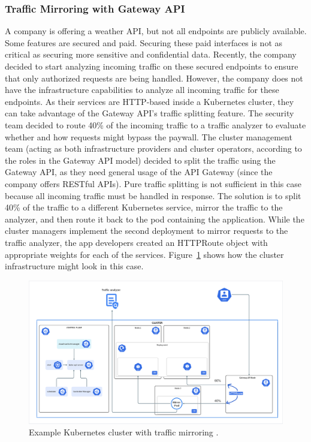 
\subsubsection{Traffic Mirroring with Gateway API}
\label{subsubsection:mirroring}

A company is offering a weather API, but not all endpoints are publicly available. Some features are secured and paid. Securing these paid interfaces is not as critical as securing more sensitive and confidential data. Recently, the company decided to start analyzing incoming traffic on these secured endpoints to ensure that only authorized requests are being handled. However, the company does not have the infrastructure capabilities to analyze all incoming traffic for these endpoints. As their services are HTTP-based inside a Kubernetes cluster, they can take advantage of the Gateway API’s traffic splitting feature. The security team decided to route 40\% of the incoming traffic to a traffic analyzer to evaluate whether and how requests might bypass the paywall. The cluster management team (acting as both infrastructure providers and cluster operators, according to the roles in the Gateway API model) decided to split the traffic using the Gateway API, as they need general usage of the API Gateway (since the company offers RESTful APIs). Pure traffic splitting is not sufficient in this case because all incoming traffic must be handled in response. The solution is to split 40\% of the traffic to a different Kubernetes service, mirror the traffic to the analyzer, and then route it back to the pod containing the application. While the cluster managers implement the second deployment to mirror requests to the traffic analyzer, the app developers created an HTTPRoute object with appropriate weights for each of the services. Figure~\ref{fig:mirroringImg} shows how the cluster infrastructure might look in this case.


\begin{figure}[H]
    \centering
    \includegraphics[width=1\columnwidth]{images/ingress.png}
    \caption{Example Kubernetes cluster with traffic mirroring \cite{KubernetesArch}\cite{K8sIcons}\cite{LucidApp}.}
    \label{fig:mirroringImg}
\end{figure}

